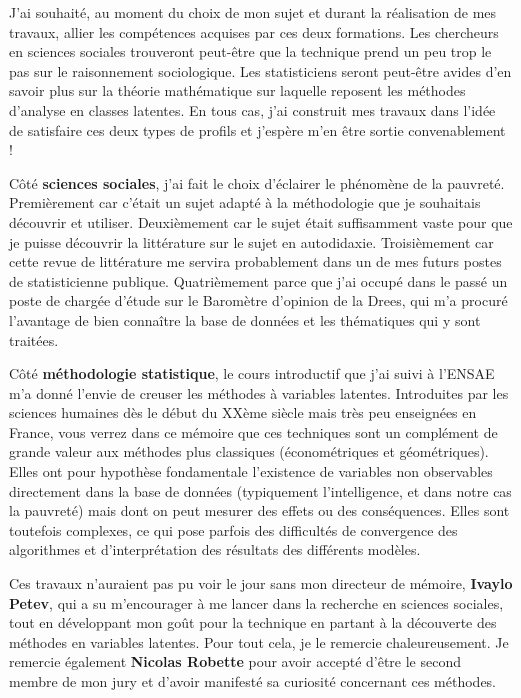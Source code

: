 \documentclass[12pt,a4paper]{reedthesis}
\begin{document}
J'ai souhaité, au moment du choix de mon sujet et durant la réalisation de mes travaux, allier les compétences acquises par ces deux formations. Les chercheurs en sciences sociales trouveront peut-être que la technique prend un peu trop le pas sur le raisonnement sociologique. Les statisticiens seront peut-être avides d'en savoir plus sur la théorie mathématique sur laquelle reposent les méthodes d'analyse en classes latentes. En tous cas, j'ai construit mes travaux dans l'idée de satisfaire ces deux types de profils et j'espère m'en être sortie convenablement !

Côté \textbf{sciences sociales}, j'ai fait le choix d'éclairer le phénomène de la pauvreté. Premièrement car c'était un sujet adapté à la méthodologie que je souhaitais découvrir et utiliser. Deuxièmement car le sujet était suffisamment vaste pour que je puisse découvrir la littérature sur le sujet en autodidaxie. Troisièmement car cette revue de littérature me servira probablement dans un de mes futurs postes de statisticienne publique. Quatrièmement parce que j'ai occupé dans le passé un poste de chargée d'étude sur le Baromètre d'opinion de la Drees, qui m'a procuré l'avantage de bien connaître la base de données et les thématiques qui y sont traitées.

Côté \textbf{méthodologie statistique}, le cours introductif que j'ai suivi à l'ENSAE m'a donné l'envie de creuser les méthodes à variables latentes. Introduites par les sciences humaines dès le début du XXème siècle mais très peu enseignées en France, vous verrez dans ce mémoire que ces techniques sont un complément de grande valeur aux méthodes plus classiques (économétriques et géométriques). Elles ont pour hypothèse fondamentale l'existence de variables non observables directement dans la base de données (typiquement l'intelligence, et dans notre cas la pauvreté) mais dont on peut mesurer des effets ou des conséquences. Elles sont toutefois complexes, ce qui pose parfois des difficultés de convergence des algorithmes et d'interprétation des résultats des différents modèles.

Ces travaux n'auraient pas pu voir le jour sans mon directeur de mémoire, \textbf{Ivaylo Petev}, qui a su m'encourager à me lancer dans la recherche en sciences sociales, tout en développant mon goût pour la technique en partant à la découverte des méthodes en variables latentes. Pour tout cela, je le remercie chaleureusement. Je remercie également \textbf{Nicolas Robette} pour avoir accepté d'être le second membre de mon jury et d'avoir manifesté sa curiosité concernant ces méthodes.
\end{document}
